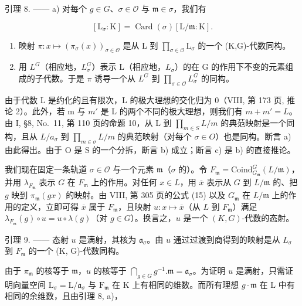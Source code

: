 引理 8. —— a) 对每个 \(g \in G\)、\(\sigma \in \mathcal{O}\) 与 \(\mathfrak{m} \in \sigma\)，我们有

\[
[ \mathrm{L} _ {\sigma}: \mathrm{K} ] = \operatorname{Card} (\sigma) [ \mathrm{L} / \mathfrak {m}: \mathrm{K} ].
\]

\begin{enumerate}
\def\labelenumi{\alph{enumi})}
\setcounter{enumi}{1}
\item
  映射 \(\pi : x \mapsto (\pi_{\sigma}(x))_{\sigma \in \mathcal{O}}\) 是从 L 到 \(\prod_{\sigma \in \mathcal{O}} \mathrm{L}_{\sigma}\) 的一个 (K,G)-代数同构。
\item
  用 \(L^{G}\)（相应地，\(L_{\sigma}^{G}\)）表示 L（相应地，\(L_{\sigma}\)）的在 G 的作用下不变的元素组成的子代数。于是 \(\pi\) 诱导一个从 \(L^{G}\) 到 \(\prod_{\sigma\in\mathcal{O}}L_{\sigma}^{G}\) 的同构。
\end{enumerate}

由于代数 L 是约化的且有限次，L 的极大理想的交化归为 0（VIII, 第 173 页, 推论 2）。此外，若 m 与 \(m'\) 是 L 的两个不同的极大理想，则我们有 \(m + m' = L\)。由 I, §8, No.~11, 第 110 页的命题 10，从 L 到 \(\prod_{m \in S} L/m\) 的典范映射是一个同构，且从 \(L/a_{\sigma}\) 到 \(\prod_{m \in \sigma} L/m\) 的典范映射（对每个 \(\sigma \in O\)）也是同构。断言 a) 由此得出。由于 O 是 S 的一个分拆，断言 b) 成立；断言 c) 是 b) 的直接推论。

我们现在固定一条轨道 \(\sigma \in \mathcal{O}\) 与一个元素 \(\mathfrak{m}\)（\(\sigma\) 的）。令 \(F_{\mathfrak{m}} = \text{Coind}_{G_{\mathfrak{m}}}^{G}(L/\mathfrak{m})\)，并用 \(\lambda_{F_{\mathfrak{m}}}\) 表示 \(G\) 在 \(F_{\mathfrak{m}}\) 上的作用。对任何 \(x \in L\)，用 \(\overline{x}\) 表示从 \(G\) 到 \(L/\mathfrak{m}\) 的、把 \(g\) 映到 \(\pi_{\mathfrak{m}}(gx)\) 的映射。由 VIII, 第 305 页的公式 (15) 以及 \(G_{\mathfrak{m}}\) 在 \(L/\mathfrak{m}\) 上的作用的定义，立即可得 \(\overline{x}\) 属于 \(F_{\mathfrak{m}}\)，且映射 \(u: x \mapsto \overline{x}\)（从 \(L\) 到 \(F_{\mathfrak{m}}\)）满足 \(\lambda_{F_{\mathfrak{m}}}(g) \circ u = u \circ \lambda(g)\)（对 \(g \in G\)）。换言之，\(u\) 是一个 \((K, G)\)-代数的态射。

引理 9. —— 态射 \(u\) 是满射，其核为 \(\mathfrak{a}_{\sigma}\)。由 \(u\) 通过过渡到商得到的映射是从 \(L_{\sigma}\) 到 \(F_{\mathfrak{m}}\) 的一个 (K, G)-代数同构。

由于 \(\pi_{\mathfrak{m}}\) 的核等于 \(\mathfrak{m}\)，\(u\) 的核等于 \(\bigcap_{g\in G}g^{-1}.\mathfrak{m} = \mathfrak{a}_{\sigma}\)。为证明 \(u\) 是满射，只需证明向量空间 \(\mathrm{L}_{\sigma} = \mathrm{L} / \mathfrak{a}_{\sigma}\) 与 \(\mathrm{F}_{\mathfrak{m}}\) 在 \(\mathrm{K}\) 上有相同的维数。而所有理想 \(g\cdot \mathfrak{m}\) 在 \(\mathrm{L}\) 中有相同的余维数，且由引理 8, a)，

